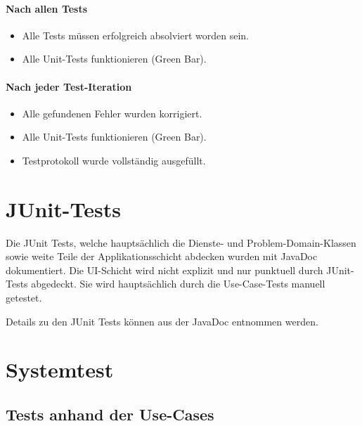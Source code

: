 \documentclass[12pt,halfparskip]{scrartcl}
\begin{document}
	\paragraph{Nach allen Tests}\label{ssub:nach_allen_tests} %
		\begin{itemize}
			\item Alle Tests müssen erfolgreich absolviert worden sein.
			\item Alle Unit-Tests funktionieren (Green Bar).
		\end{itemize}
	\paragraph{Nach jeder Test-Iteration}\label{ssub:nach_jeder_test_iteration} %
		\begin{itemize}
			\item Alle gefundenen Fehler wurden korrigiert.
			\item Alle Unit-Tests funktionieren (Green Bar).
			\item Testprotokoll wurde vollständig ausgefüllt.
		\end{itemize}

\section{JUnit-Tests}\label{sec:junit_tests} %
Die JUnit Tests, welche hauptsächlich die Dienste- und Problem-Domain-Klassen sowie weite Teile der Applikationsschicht abdecken wurden mit JavaDoc dokumentiert. Die UI-Schicht wird nicht explizit und nur punktuell durch JUnit-Tests abgedeckt. Sie wird hauptsächlich durch die Use-Case-Tests manuell getestet.

Details zu den JUnit Tests können aus der JavaDoc entnommen werden.

\section{Systemtest} %
\label{sec:systemtest}

\subsection{Tests anhand der Use-Cases}\label{sub:tests_anhand_der_use_cases} %
\end{document}
